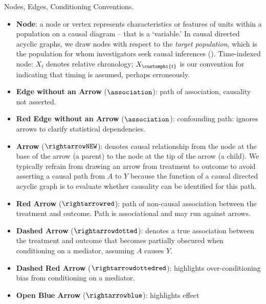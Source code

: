 \documentclass[
  single column]{article}
\begin{document}
\begin{table}

\caption{\label{tbl-general}Nodes, Edges, Conditioning Conventions.}

\centering{

\terminologygeneraldags

}

\end{table}%

\begin{itemize}
\item
  \textbf{Node}: a node or vertex represents characteristics or features
  of units within a population on a causal diagram -- that is a
  `variable.' In causal directed acyclic graphs, we draw nodes with
  respect to the \emph{target population}, which is the population for
  whom investigators seek causal inferences
  (). Time-indexed
  node: \(X_t\) denotes relative chronology; \(X_{\customphi{t}}\) is
  our convention for indicating that timing is assumed, perhaps
  erroneously.
\item
  \textbf{Edge without an Arrow} (\(\association\)): path of
  association, causality not asserted.
\item
  \textbf{Red Edge without an Arrow} (\(\association\)): confounding
  path: ignores arrows to clarify statistical dependencies.
\item
  \textbf{Arrow} (\(\rightarrowNEW\)): denotes causal relationship from
  the node at the base of the arrow (a parent) to the node at the tip of
  the arrow (a child). We typically refrain from drawing an arrow from
  treatment to outcome to avoid asserting a causal path from \(A\) to
  \(Y\) because the function of a causal directed acyclic graph is to
  evaluate whether causality can be identified for this path.
\item
  \textbf{Red Arrow} (\(\rightarrowred\)): path of non-causal
  association between the treatment and outcome. Path is associational
  and may run against arrows.
\item
  \textbf{Dashed Arrow} (\(\rightarrowdotted\)): denotes a true
  association between the treatment and outcome that becomes partially
  obscured when conditioning on a mediator, assuming \(A\) causes \(Y\).
\item
  \textbf{Dashed Red Arrow} (\(\rightarrowdottedred\)): highlights
  over-conditioning bias from conditioning on a mediator.
\item
  \textbf{Open Blue Arrow} (\(\rightarrowblue\)): highlights effect

\end{itemize}
\end{document}
